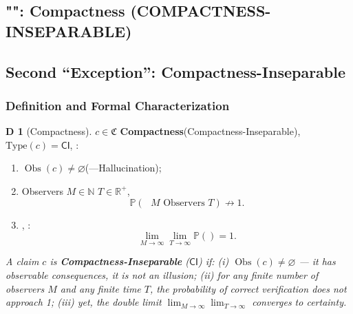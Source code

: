 \documentclass[12pt,a4paper]{article}
\theoremstyle{plain}
\theoremstyle{definition}
\newtheorem{definition}[theorem]Definition
\theoremstyle{remark}
\newcommand{\R}{\mathbb{R}}
\newcommand{\N}{\mathbb{N}}
\newcommand{\Pbb}{\mathbb{P}}
\newcommand{\ClaimSpace}{\mathfrak{C}}
\newcommand{\Null}{\varnothing}
\DeclareMathOperator{\ObsSet}{Obs}
\begin{document}
\subsection{"": Compactness (COMPACTNESS-INSEPARABLE)}
\subsection{Second ``Exception'': Compactness-Inseparable}
\subsubsection{}
\subsubsection{Definition and Formal Characterization}
\begin{definition}[Compactness]\label{def:compactness_inseparable}
 $c \in \ClaimSpace$ \textbf{Compactness}(Compactness-Inseparable), $\mathrm{Type}(c) = \mathsf{CI}$, : 
\begin{enumerate}[label=(\roman*)]
 \item $\ObsSet(c) \neq \Null$(---Hallucination); 
 \item Observers $M \in \N$ $T \in \R^+$, 
 \begin{equation}\label{eq:ci_bound}
 \Pbb(\text{ $M$ Observers $T$}) \nrightarrow 1.
 \end{equation}
 \item, : 
 \begin{equation}\label{eq:ci_limit}
 \lim_{M \to \infty} \lim_{T \to \infty} \Pbb(\text{}) = 1.
 \end{equation}
\end{enumerate}
\end{definition}
\vspace{4pt}
\noindent
\textit{A claim $c$ is \textbf{Compactness-Inseparable} ($\mathsf{CI}$) if: (i) $\ObsSet(c) \neq \Null$ --- it has observable consequences, it is not an illusion; (ii) for any finite number of observers $M$ and any finite time $T$, the probability of correct verification does not approach 1; (iii) yet, the double limit $\lim_{M\to\infty} \lim_{T\to\infty}$ converges to certainty.}
\subsubsection{}
\end{document}
